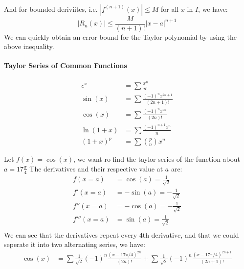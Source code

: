\documentclass[11pt]{article}
\begin{document}
\paragraph{} And for bounded deriviites, i.e. $|f^{(n+1)}(x)| \le M$ for all $x$ in $I$, we have:
\begin{equation}
    |R_n(x)| \le \frac{M}{(n+1)!} |x-a|^{n+1}
\end{equation}
We can quickly obtain an error bound for the Taylor polynomial by using the above inequality.
\paragraph{Taylor Series of Common Functions}
\begin{align}
    e^x &= \sum \frac{x^n}{n!} \\
    \sin(x) &= \sum \frac{(-1)^n x^{2n+1}}{(2n+1)!} \\
    \cos(x) &= \sum \frac{(-1)^n x^{2n}}{(2n)!} \\
    \ln(1+x) &= \sum \frac{(-1)^{n+1} x^n}{n} \\
    (1+x)^p &= \sum \binom{p}{n} x^n
\end{align}
\begin{example}
    Let $f(x) = \cos(x)$, we want ro find the taylor series of the function about $a=17\frac{\pi}{4}$ The derivatives and their respective value at $a$ are:
    \begin{align*}
        f(x=a) &= \cos(a) = \frac{1}{\sqrt{2}} \\
        f'(x=a) &= -\sin(a) = -\frac{1}{\sqrt{2}} \\    
        f''(x=a) &= -\cos(a) = -\frac{1}{\sqrt{2}} \\
        f'''(x=a) &= \sin(a) = \frac{1}{\sqrt{2}} \\
    \end{align*}
    We can see that the derivatives repeat every 4th derivative, and that we could seperate it into two alternating series, we have:
    \begin{align*}
        \cos(x) &= \sum \frac{1}{\sqrt{2}} (-1)^n \frac{(x-17\pi/4)^{2n}}{(2n)!} + \sum \frac{1}{\sqrt{2}} (-1)^n \frac{(x-17\pi/4)^{2n+1}}{(2n+1)!} \\
    \end{align*}
\end{example}
\end{document}
